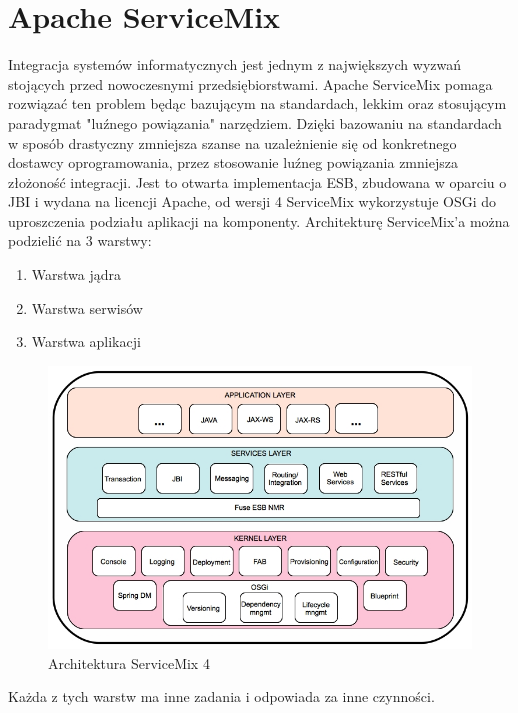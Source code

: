 \section{Apache ServiceMix}
Integracja systemów informatycznych jest jednym z największych wyzwań stojących przed nowoczesnymi przedsiębiorstwami. Apache ServiceMix pomaga rozwiązać ten problem będąc bazującym na standardach, lekkim oraz stosującym paradygmat "luźnego powiązania" narzędziem. Dzięki bazowaniu na standardach w sposób drastyczny zmniejsza szanse na uzależnienie się od konkretnego dostawcy oprogramowania, przez stosowanie luźneg powiązania zmniejsza złożoność integracji. 
Jest to otwarta implementacja ESB, zbudowana w oparciu o JBI i wydana na licencji Apache, od wersji 4 ServiceMix wykorzystuje OSGi do uproszczenia podziału aplikacji na komponenty. 	
Architekturę ServiceMix'a można podzielić na 3 warstwy:
\begin{enumerate}
	\item Warstwa jądra
	\item Warstwa serwisów
	\item Warstwa aplikacji
\end{enumerate}  
\newpage
\begin{figure}[!h]
	\centering
	\includegraphics[scale=0.45]{ServiceMixArchitektura.jpg} 
	\caption{Architektura ServiceMix 4}
\end{figure}
Każda z tych warstw ma inne zadania i odpowiada za inne czynności.
